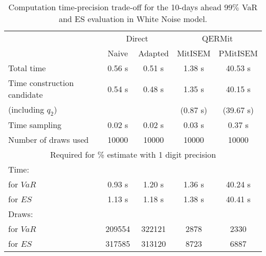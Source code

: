 { \renewcommand{\arraystretch}{1.3} 
\begin{table}[h] 
\centering 
\caption{Computation time-precision trade-off for the 10-days ahead  $99\%$ VaR and ES evaluation in White Noise model.} 
\label{tab:time_precision_WN} 
\begin{tabular}{lcccc}  
  & \multicolumn{2}{c}{Direct} & \multicolumn{2}{c}{QERMit}  \\ \cline{2-5} 
  & Naive & Adapted & MitISEM & PMitISEM  \\ \hline 
Total time & 0.56 s & 0.51 s & 1.38 s & 40.53 s \\ 
Time construction candidate & 0.54 s & 0.48 s & 1.35 s & 40.15 s \\ 
 (including $q_{2}$) &   &  & (0.87 s) & (39.67 s) \\ 
Time sampling & 0.02 s & 0.02 s & 0.03 s & 0.37 s  \\  
Number of draws used & 10000 & 10000 & 10000 & 10000 \\ \hline 
\multicolumn{5}{c}{Required for \% estimate with 1 digit precision} \\ \hline 
Time: &  &  &   &  \\ 
\hspace{1cm} for $VaR$ & 0.93 s & 1.20 s & 1.36 s & 40.24 s \\ 
\hspace{1cm} for $ES$ & 1.13 s & 1.18 s & 1.38 s & 40.41 s \\ 
Draws: &  &  &   &  \\ 
\hspace{1cm} for $VaR$ & 209554 & 322121  &   2878  &   2330  \\ 
\hspace{1cm} for $ES$ & 317585 & 313120  &   8723   &   6887  \\ 
\hline 
\end{tabular} 
\end{table} 
} 
